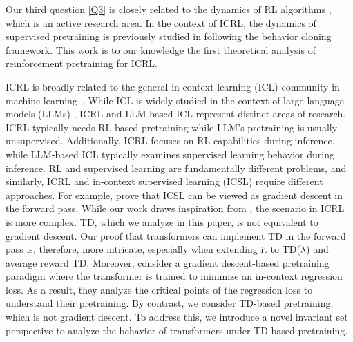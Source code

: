 \documentclass{article}
\begin{document}

Our third question \ref{Q3} is closely related to the dynamics of RL algorithms \citep{borkar2000ode,bhandari2018finite,cai2019neural,qian2024almost,liu2024ode},
which is an active research area.
In the context of ICRL,
the dynamics of supervised pretraining is previously studied in \citet{lin2023transformers} following the behavior cloning framework.
This work is to our knowledge the first theoretical analysis of reinforcement pretraining for ICRL.


ICRL is broadly related to the general in-context learning (ICL) community in machine learning~\citep{garg2022can,muller2022transformers,akyurek2023learning,vonoswald2023transformers,zhao2023transformers,allen2023physics,mahankali2023one,ahn2024transformers,zhang2024trained}.
While ICL is widely studied in the context of large language models (LLMs) \citep{brown2020incontext}, ICRL and LLM-based ICL represent distinct areas of research.
ICRL typically needs RL-based pretraining while LLM's pretraining is usually unsupervised.
Additionally, ICRL focuses on RL capabilities during inference, while LLM-based ICL typically examines supervised learning behavior during inference. 
RL and supervised learning are fundamentally different problems, and similarly, ICRL and in-context supervised learning (ICSL) require different approaches.
For example, \citet{ahn2024transformers} prove that ICSL can be viewed as gradient descent in the forward pass. While our work draws inspiration from \citet{ahn2024transformers}, the scenario in ICRL is more complex. 
TD, which we analyze in this paper, is not equivalent to gradient descent. 
Our proof that transformers can implement TD in the forward pass is, therefore, more intricate, especially when extending it to TD($\lambda$) and average reward TD.
Moreover,
\citet{ahn2024transformers} consider a gradient descent-based pretraining paradigm where the transformer is trained to minimize an in-context regression loss.
As a result, they analyze the critical points of the regression loss to understand their pretraining.
By contrast, we consider TD-based pretraining, which is not gradient descent.
To address this, we introduce a novel invariant set perspective to analyze the behavior of transformers under TD-based pretraining.
\end{document}
